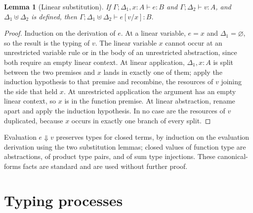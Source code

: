 \documentclass[11pt,openany]{book}
\newtheorem{lemma}[theorem]{Lemma}
\theoremstyle{remark}
\begin{document}
\begin{lemma}[Linear substitution]\label{lem:lsubst}
If $\Gamma;\Delta_1,x{:}A\vdash e:B$ and $\Gamma;\Delta_2\vdash v:A$, and
$\Delta_1\uplus\Delta_2$ is defined, then
$\Gamma;\Delta_1\uplus\Delta_2\vdash e[v/x]:B$.
\end{lemma}

\begin{proof}
Induction on the derivation of $e$. At a linear variable, $e=x$ and
$\Delta_1=\varnothing$, so the result is the typing of $v$. The linear
variable $x$ cannot occur at an unrestricted variable rule or in the body
of an unrestricted abstraction, since both require an empty linear
context. At linear application, $\Delta_1,x{:}A$ is split between the two
premises and $x$ lands in exactly one of them; apply the induction
hypothesis to that premise and recombine, the resources of $v$ joining the
side that held $x$. At unrestricted application the argument has an empty
linear context, so $x$ is in the function premise. At linear abstraction,
rename apart and apply the induction hypothesis. In no case are the
resources of $v$ duplicated, because $x$ occurs in exactly one branch of
every split.
\end{proof}

Evaluation $e\Downarrow v$ preserves types for closed terms, by induction
on the evaluation derivation using the two substitution lemmas; closed
values of function type are abstractions, of product type pairs, and of
sum type injections. These canonical-forms facts are standard
\cite{pierce} and are used without further proof.

\section{Typing processes}
\end{document}
